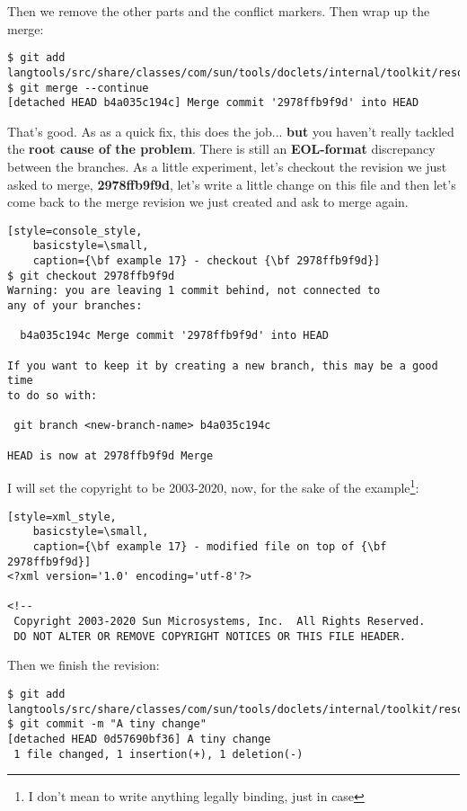 Then we remove the other parts and the conflict markers. Then wrap up the merge:

\begin{lstlisting}[style=console_style,
	basicstyle=\small,
	caption={\bf example 17} - Wrap up the merge]
$ git add langtools/src/share/classes/com/sun/tools/doclets/internal/toolkit/resources/doclet.xml
$ git merge --continue
[detached HEAD b4a035c194c] Merge commit '2978ffb9f9d' into HEAD
\end{lstlisting}

That's good. As as a quick fix, this does the job... {\bf but} you haven't really tackled the {\bf root cause of the problem}.
There is still an {\bf EOL-format} discrepancy between the branches. As a little experiment, let's checkout the revision
we just asked to merge, {\bf 2978ffb9f9d}, let's write a little change on this file and then let's come back to the merge
revision we just created and ask to merge again.

\begin{lstlisting}[style=console_style,
	basicstyle=\small,
	caption={\bf example 17} - checkout {\bf 2978ffb9f9d}]
$ git checkout 2978ffb9f9d
Warning: you are leaving 1 commit behind, not connected to
any of your branches:

  b4a035c194c Merge commit '2978ffb9f9d' into HEAD

If you want to keep it by creating a new branch, this may be a good time
to do so with:

 git branch <new-branch-name> b4a035c194c

HEAD is now at 2978ffb9f9d Merge
\end{lstlisting}

I will set the copyright to be 2003-2020, now, for the sake of the example\footnote{I don't mean to write anything legally binding,
just in case}:

\begin{lstlisting}[style=xml_style,
	basicstyle=\small,
	caption={\bf example 17} - modified file on top of {\bf 2978ffb9f9d}]
<?xml version='1.0' encoding='utf-8'?>

<!--
 Copyright 2003-2020 Sun Microsystems, Inc.  All Rights Reserved.
 DO NOT ALTER OR REMOVE COPYRIGHT NOTICES OR THIS FILE HEADER.
\end{lstlisting}

Then we finish the revision:

\begin{lstlisting}[style=console_style,
	basicstyle=\small,
	caption={\bf example 17} - creating new revision]
$ git add langtools/src/share/classes/com/sun/tools/doclets/internal/toolkit/resources/doclet.xml
$ git commit -m "A tiny change"
[detached HEAD 0d57690bf36] A tiny change
 1 file changed, 1 insertion(+), 1 deletion(-)
\end{lstlisting}

